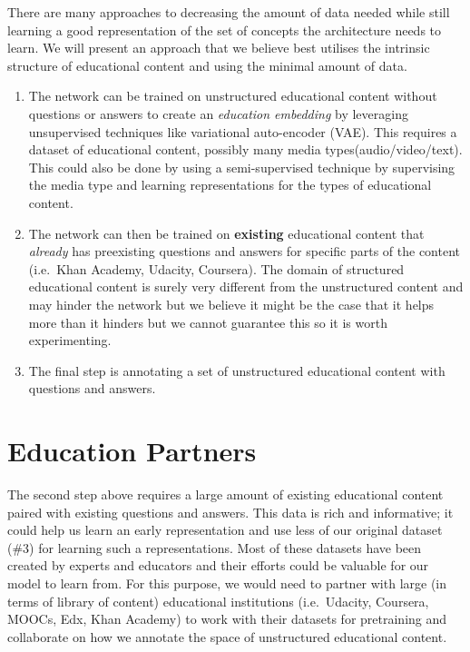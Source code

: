 \documentclass[]{book}
\theoremstyle{definition}
\theoremstyle{definition}
\theoremstyle{definition}
\theoremstyle{remark}
\begin{document}
There are many approaches to decreasing the amount of data needed while
still learning a good representation of the set of concepts the
architecture needs to learn. We will present an approach that we believe
best utilises the intrinsic structure of educational content and using
the minimal amount of data.

\begin{enumerate}
\def\labelenumi{\arabic{enumi}.}
\item
  The network can be trained on unstructured educational content without
  questions or answers to create an \emph{education embedding} by
  leveraging unsupervised techniques like variational auto-encoder
  (VAE). This requires a dataset of educational content, possibly many
  media types(audio/video/text). This could also be done by using a
  semi-supervised technique by supervising the media type and learning
  representations for the types of educational content.
\item
  The network can then be trained on \textbf{existing} educational
  content that \emph{already} has preexisting questions and answers for
  specific parts of the content (i.e.~Khan Academy, Udacity, Coursera).
  The domain of structured educational content is surely very different
  from the unstructured content and may hinder the network but we
  believe it might be the case that it helps more than it hinders but we
  cannot guarantee this so it is worth experimenting.
\item
  The final step is annotating a set of unstructured educational content
  with questions and answers.
\end{enumerate}

\section{Education Partners}\label{education-partners}

The second step above requires a large amount of existing educational
content paired with existing questions and answers. This data is rich
and informative; it could help us learn an early representation and use
less of our original dataset (\#3) for learning such a representations.
Most of these datasets have been created by experts and educators and
their efforts could be valuable for our model to learn from. For this
purpose, we would need to partner with large (in terms of library of
content) educational institutions (i.e.~Udacity, Coursera, MOOCs, Edx,
Khan Academy) to work with their datasets for pretraining and
collaborate on how we annotate the space of unstructured educational
content.
\end{document}
